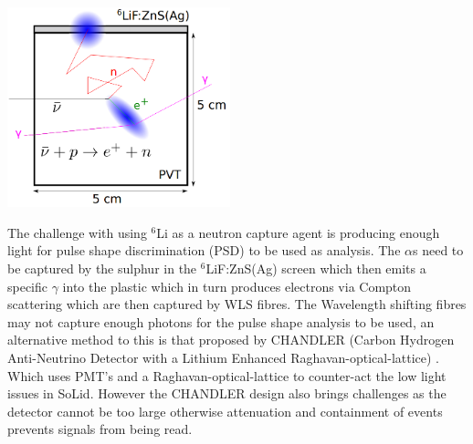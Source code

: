 \documentclass[12pt,a4paper]{article}
\newenvironment{Figure}
  {\par\medskip\noindent\minipage{\linewidth}}
  {\endminipage\par\medskip}
\begin{document}
\begin{Figure}
 \centering
 \includegraphics[height=58mm]{SoLid_cube.png}
 \label{Solid_cub_diagram}
\end{Figure}

The challenge with using $^6$Li as a neutron capture agent is producing enough light for pulse shape discrimination (PSD) to be used as analysis. The $\alpha$s need to be captured by the sulphur in the $^6$LiF:ZnS(Ag) screen which then emits a specific $\gamma$ into the plastic which in turn produces electrons via Compton scattering which are then captured by WLS fibres. The Wavelength shifting fibres may not capture enough photons for the pulse shape analysis to be used, an alternative method to this is that proposed by CHANDLER (Carbon Hydrogen Anti-Neutrino Detector with a Lithium Enhanced Raghavan-optical-lattice) \cite{aap2015}. Which uses PMT's and a Raghavan-optical-lattice to counter-act the low light issues in SoLid. However the CHANDLER design also brings challenges as the detector cannot be too large otherwise attenuation and containment of events prevents signals from being read. 
\end{document}
